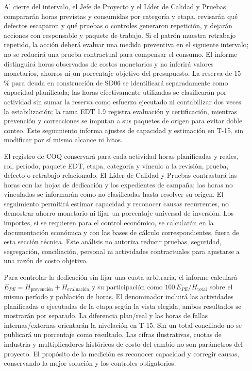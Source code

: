 \documentclass[11pt]{article}
\begin{document}
Al cierre del intervalo, el Jefe de Proyecto y el Líder de Calidad y Pruebas compararán horas previstas y consumidas por categoría y etapa, revisarán qué defectos escaparon y qué pruebas o controles generaron repetición, y dejarán acciones con responsable y paquete de trabajo. Si el patrón muestra retrabajo repetido, la acción deberá evaluar una medida preventiva en el siguiente intervalo; no se reducirá una prueba contractual para compensar el consumo. El informe distinguirá horas observadas de costos monetarios y no inferirá valores monetarios, ahorros ni un porcentaje objetivo del presupuesto. La reserva de 15 \% para deuda en construcción de SD06 se identificará separadamente como capacidad planificada; las horas efectivamente utilizadas se clasificarán por actividad sin sumar la reserva como esfuerzo ejecutado ni contabilizar dos veces la estabilización; la rama EDT 1.9 registra evaluación y certificación, mientras prevención y correcciones se imputan a sus paquetes de origen para evitar doble conteo. Este seguimiento informa ajustes de capacidad y estimación en T-15, sin modificar por sí mismo alcance ni hitos.

El registro de COQ conservará para cada actividad horas planificadas y reales, rol, período, paquete EDT, etapa, categoría y vínculo a la revisión, prueba, defecto o retrabajo relacionado. El Líder de Calidad y Pruebas contrastará las horas con las hojas de dedicación y los expedientes de campaña; las horas no vinculadas se informarán como no clasificadas hasta resolver su origen. El seguimiento permitirá estimar capacidad y reconocer causas recurrentes, no demostrar ahorro monetario ni fijar un porcentaje universal de inversión. Los importes, si se requieren para el control económico, se calcularán en la documentación económica y con las bases de cálculo correspondientes, fuera de esta sección técnica. Este análisis no autoriza reducir pruebas, seguridad, segregación, conciliación, personal ni actividades contractuales para ajustarse a una razón de costo objetivo.

Para controlar la dedicación sin fijar una cuota arbitraria, el informe calculará $E_{PE}=H_{\text{prevención}}+H_{\text{evaluación}}$ y su participación como $100\,E_{PE}/H_{\text{total}}$ sobre el mismo período y población de horas. El denominador incluirá las actividades planificadas o ejecutadas de la etapa según la vista elegida; ambos resultados se mostrarán por separado. La diferencia plan/real y las horas de fallas internas/externas orientarán la nivelación en T-15. Sin un total conciliado no se publicará un porcentaje como resultado. Las cifras ilustrativas, cuotas de industria y multiplicadores históricos de costo del cambio no son parámetros del proyecto. El propósito de la medición es reconocer capacidad y corregir causas, conservando la mejor solución y los controles obligatorios.
\end{document}
